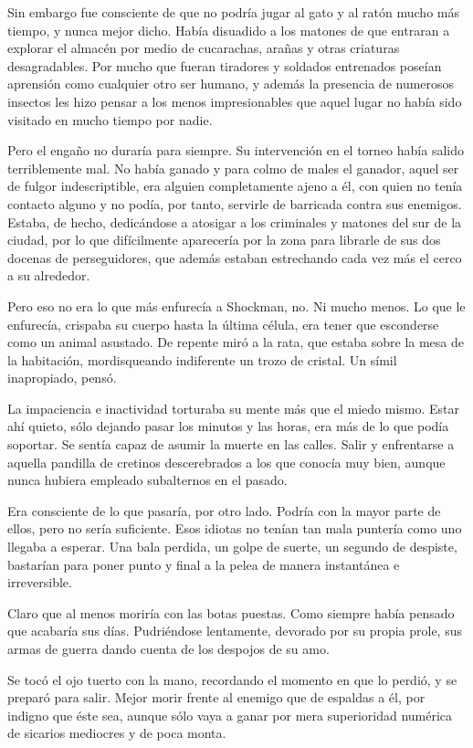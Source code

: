 Sin embargo fue consciente de que no podría jugar al gato y al ratón mucho más tiempo, y nunca mejor dicho. Había disuadido a los matones de que entraran a explorar el almacén por medio de cucarachas, arañas y otras criaturas desagradables. Por mucho que fueran tiradores y soldados entrenados poseían aprensión como cualquier otro ser humano, y además la presencia de numerosos insectos les hizo pensar a los menos impresionables que aquel lugar no había sido visitado en mucho tiempo por nadie.

Pero el engaño no duraría para siempre. Su intervención en el torneo había salido terriblemente mal. No había ganado y para colmo de males el ganador, aquel ser de fulgor indescriptible, era alguien completamente ajeno a él, con quien no tenía contacto alguno y no podía, por tanto, servirle de barricada contra sus enemigos. Estaba, de hecho, dedicándose a atosigar a los criminales y matones del sur de la ciudad, por lo que difícilmente aparecería por la zona para librarle de sus dos docenas de perseguidores, que además estaban estrechando cada vez más el cerco a su alrededor.

Pero eso no era lo que más enfurecía a Shockman, no. Ni mucho menos. Lo que le enfurecía, crispaba su cuerpo hasta la última célula, era tener que esconderse como un animal asustado. De repente miró a la rata, que estaba sobre la mesa de la habitación, mordisqueando indiferente un trozo de cristal. Un símil inapropiado, pensó.

La impaciencia e inactividad torturaba su mente más que el miedo mismo. Estar ahí quieto, sólo dejando pasar los minutos y las horas, era más de lo que podía soportar. Se sentía capaz de asumir la muerte en las calles. Salir y enfrentarse a aquella pandilla de cretinos descerebrados a los que conocía muy bien, aunque nunca hubiera empleado subalternos en el pasado.

Era consciente de lo que pasaría, por otro lado. Podría con la mayor parte de ellos, pero no sería suficiente. Esos idiotas no tenían tan mala puntería como uno llegaba a esperar. Una bala perdida, un golpe de suerte, un segundo de despiste, bastarían para poner punto y final a la pelea de manera instantánea e irreversible.

Claro que al menos moriría con las botas puestas. Como siempre había pensado que acabaría sus días. Pudriéndose lentamente, devorado por su propia prole, sus armas de guerra dando cuenta de los despojos de su amo.

Se tocó el ojo tuerto con la mano, recordando el momento en que lo perdió, y se preparó para salir. Mejor morir frente al enemigo que de espaldas a él, por indigno que éste sea, aunque sólo vaya a ganar por mera superioridad numérica de sicarios mediocres y de poca monta.

